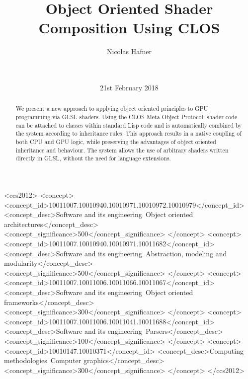 \documentclass{sig-alternate}
\begin{document}
\doi{}
\isbn{}

\begin{CCSXML}
  <ccs2012>
  <concept>
  <concept_id>10011007.10010940.10010971.10010972.10010979</concept_id>
  <concept_desc>Software and its engineering~Object oriented architectures</concept_desc>
  <concept_significance>500</concept_significance>
  </concept>
  <concept>
  <concept_id>10011007.10010940.10010971.10011682</concept_id>
  <concept_desc>Software and its engineering~Abstraction, modeling and modularity</concept_desc>
  <concept_significance>500</concept_significance>
  </concept>
  <concept>
  <concept_id>10011007.10011006.10011066.10011067</concept_id>
  <concept_desc>Software and its engineering~Object oriented frameworks</concept_desc>
  <concept_significance>300</concept_significance>
  </concept>
  <concept>
  <concept_id>10011007.10011006.10011041.10011688</concept_id>
  <concept_desc>Software and its engineering~Parsers</concept_desc>
  <concept_significance>100</concept_significance>
  </concept>
  <concept>
  <concept_id>10010147.10010371</concept_id>
  <concept_desc>Computing methodologies~Computer graphics</concept_desc>
  <concept_significance>300</concept_significance>
  </concept>
  </ccs2012>
\end{CCSXML}


\title{Object Oriented Shader Composition Using CLOS}

\author{
  \alignauthor
  Nicolas Hafner\\
  \\
  \\
}
\date{21st February 2018}

\maketitle

\begin{abstract}
  We present a new approach to applying object oriented principles to GPU programming via GLSL shaders. Using the CLOS Meta Object Protocol, shader code can be attached to classes within standard Lisp code and is automatically combined by the system according to inheritance rules. This approach results in a native coupling of both CPU and GPU logic, while preserving the advantages of object oriented inheritance and behaviour. The system allows the use of arbitrary shaders written directly in GLSL, without the need for language extensions.
\end{abstract}
\end{document}
